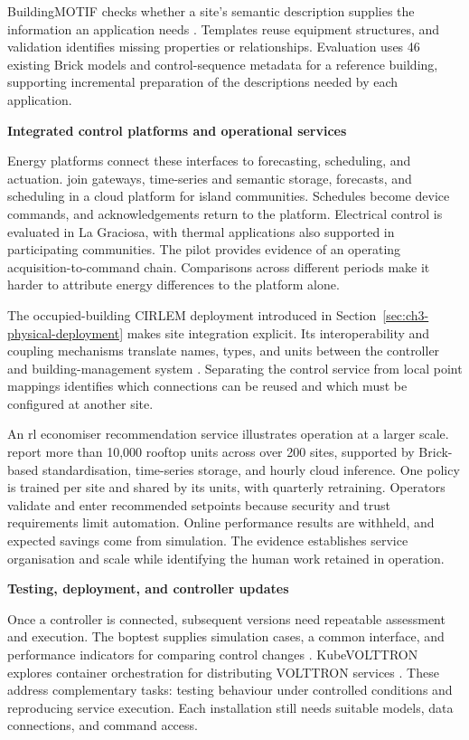 BuildingMOTIF checks whether a site's semantic description supplies the information an application needs \parencite{fierro2022buildingmotif}. Templates reuse equipment structures, and validation identifies missing properties or relationships. Evaluation uses 46 existing Brick models and control-sequence metadata for a reference building, supporting incremental preparation of the descriptions needed by each application.

\smallskip
\noindent\textbf{Integrated control platforms and operational services}\par\nobreak\smallskip
Energy platforms connect these interfaces to forecasting, scheduling, and actuation. \textcite{jelic2025islands} join gateways, time-series and semantic storage, forecasts, and scheduling in a cloud platform for island communities. Schedules become device commands, and acknowledgements return to the platform. Electrical control is evaluated in La Graciosa, with thermal applications also supported in participating communities. The pilot provides evidence of an operating acquisition-to-command chain. Comparisons across different periods make it harder to attribute energy differences to the platform alone.

The occupied-building CIRLEM deployment introduced in Section~\ref{sec:ch3-physical-deployment} makes site integration explicit. Its interoperability and coupling mechanisms translate names, types, and units between the controller and building-management system \parencite{hosseini2026cirlem}. Separating the control service from local point mappings identifies which connections can be reused and which must be configured at another site.

An \gls{rl} economiser recommendation service illustrates operation at a larger scale. \textcite{cui2023economizer} report more than 10,000 rooftop units across over 200 sites, supported by Brick-based standardisation, time-series storage, and hourly cloud inference. One policy is trained per site and shared by its units, with quarterly retraining. Operators validate and enter recommended setpoints because security and trust requirements limit automation. Online performance results are withheld, and expected savings come from simulation. The evidence establishes service organisation and scale while identifying the human work retained in operation.

\smallskip
\noindent\textbf{Testing, deployment, and controller updates}\par\nobreak\smallskip
Once a controller is connected, subsequent versions need repeatable assessment and execution. The \gls{boptest} supplies simulation cases, a common interface, and performance indicators for comparing control changes \parencite{blum2021boptest}. KubeVOLTTRON explores container orchestration for distributing VOLTTRON services \parencite{kempf2022kubevolttron}. These address complementary tasks: testing behaviour under controlled conditions and reproducing service execution. Each installation still needs suitable models, data connections, and command access.

